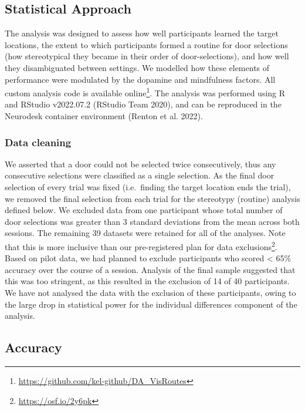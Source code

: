 \documentclass{article}
\begin{document}
\hypertarget{statistical-approach}{%
\subsection{Statistical Approach}\label{statistical-approach}}

The analysis was designed to assess how well participants learned the
target locations, the extent to which participants formed a routine for
door selections (how stereotypical they became in their order of
door-selections), and how well they disambiguated between settings. We
modelled how these elements of performance were modulated by the
dopamine and mindfulness factors. All custom analysis code is available
online\footnote{\url{https://github.com/kel-github/DA_VisRoutes}}. The
analysis was performed using R and RStudio v2022.07.2 (RStudio Team
2020), and can be reproduced in the Neurodesk container environment
(Renton et al. 2022).

\hypertarget{data-cleaning}{%
\subsubsection{Data cleaning}\label{data-cleaning}}

We asserted that a door could not be selected twice consecutively, thus
any consecutive selections were classified as a single selection. As the
final door selection of every trial was fixed (i.e.~finding the target
location ends the trial), we removed the final selection from each trial
for the stereotypy (routine) analysis defined below. We excluded data
from one participant whose total number of door selections was greater
than 3 standard deviations from the mean across both sessions. The
remaining 39 datasets were retained for all of the analyses. Note that
this is more inclusive than our pre-registered plan for data
exclusions\footnote{\url{https://osf.io/2y6pk}}. Based on pilot data, we
had planned to exclude participants who scored \textless{} 65\% accuracy
over the course of a session. Analysis of the final sample suggested
that this was too stringent, as this resulted in the exclusion of 14 of
40 participants. We have not analysed the data with the exclusion of
these participants, owing to the large drop in statistical power for the
individual differences component of the analysis.

\hypertarget{accuracy}{%
\subsection{Accuracy}\label{accuracy}}
\end{document}
